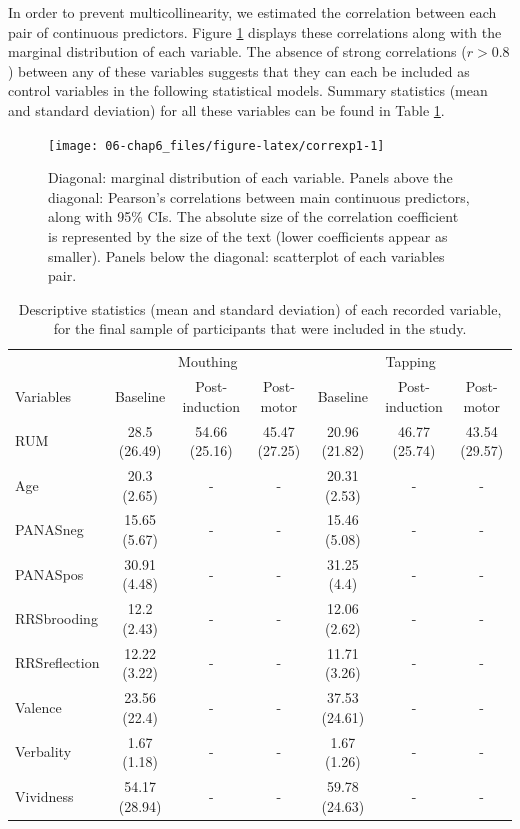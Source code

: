 \documentclass[a4paper,12pt,twoside,openright,oldfontcommands,final]{memoir}
\makeatletter
\newenvironment{lltable}{\begin{landscape}\begin{center}\begin{ThreePartTable}}{\end{ThreePartTable}\end{center}\end{landscape}}
\newcommand\LastLTentrywidth{1em}
\newlength\longtablewidth
\newcommand{\getlongtablewidth}{\begingroup \ifcsname LT@\roman{LT@tables}\endcsname \global\longtablewidth=0pt \renewcommand{\LT@entry}[2]{\global\advance\longtablewidth by ##2\relax\gdef\LastLTentrywidth{##2}}\@nameuse{LT@\roman{LT@tables}} \fi \endgroup}
\makeatother
\begin{document}
In order to prevent multicollinearity, we estimated the correlation between each pair of continuous predictors. Figure \ref{fig:correxp1} displays these correlations along with the marginal distribution of each variable. The absence of strong correlations (\(r > 0.8\)) between any of these variables suggests that they can each be included as control variables in the following statistical models. Summary statistics (mean and standard deviation) for all these variables can be found in Table \ref{tab:sumstat}.

\begin{figure}[H]
\texttt{[image: 06-chap6\_files/figure-latex/correxp1-1]} \caption{Diagonal: marginal distribution of each variable. Panels above the diagonal: Pearson's correlations between main continuous predictors, along with 95\% CIs. The absolute size of the correlation coefficient is represented by the size of the text (lower coefficients appear as smaller). Panels below the diagonal: scatterplot of each variables pair.}\label{fig:correxp1}
\end{figure}

\begin{lltable}
\small{
\begin{longtable}{lcccccc}\noalign{\getlongtablewidth\global\LTcapwidth=\longtablewidth}
\caption{\label{tab:sumstat}Descriptive statistics (mean and standard deviation) of each recorded variable, for the final sample of participants that were included in the study.}\\
\toprule
 & \multicolumn{3}{c}{Mouthing} & \multicolumn{3}{c}{Tapping} \\
\cmidrule(r){2-4} \cmidrule(r){5-7}
Variables & Baseline & Post-induction & Post-motor & Baseline & Post-induction & Post-motor\\
\midrule
RUM & 28.5 (26.49) & 54.66 (25.16) & 45.47 (27.25) & 20.96 (21.82) & 46.77 (25.74) & 43.54 (29.57)\\
Age & 20.3 (2.65) & - & - & 20.31 (2.53) & - & -\\
PANASneg & 15.65 (5.67) & - & - & 15.46 (5.08) & - & -\\
PANASpos & 30.91 (4.48) & - & - & 31.25 (4.4) & - & -\\
RRSbrooding & 12.2 (2.43) & - & - & 12.06 (2.62) & - & -\\
RRSreflection & 12.22 (3.22) & - & - & 11.71 (3.26) & - & -\\
Valence & 23.56 (22.4) & - & - & 37.53 (24.61) & - & -\\
Verbality & 1.67 (1.18) & - & - & 1.67 (1.26) & - & -\\
Vividness & 54.17 (28.94) & - & - & 59.78 (24.63) & - & -\\
\bottomrule
\end{longtable}
}
\end{lltable}
\end{document}
